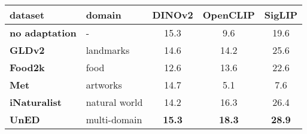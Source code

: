 \small
\begin{tabular}{llccc}
\toprule
\textbf{dataset} & \textbf{domain} & \textbf{DINOv2} & \textbf{OpenCLIP} &  \textbf{SigLIP}  \\ 
\midrule
\textbf{no adaptation}               & -             & 15.3 & 9.6  & 19.6 \\ 
\midrule
\textbf{GLDv2}~\cite{wac+20}         & landmarks     & 14.6 & 14.2 & 25.6 \\
\textbf{Food2k}~\cite{mwl+23}        & food          & 12.6 & 13.6 & 22.6 \\ 
\textbf{Met}~\cite{ygg+21}           & artworks      & 14.7 & 5.1  & 7.6  \\ 
\textbf{iNaturalist}~\cite{vms+18}   & natural world & 14.2 & 16.3 & 26.4 \\ 
\midrule
\textbf{UnED}~\cite{ycc+23}          & multi-domain  & \textbf{15.3} & \textbf{18.3} & \textbf{28.9} \\
\bottomrule
\end{tabular}